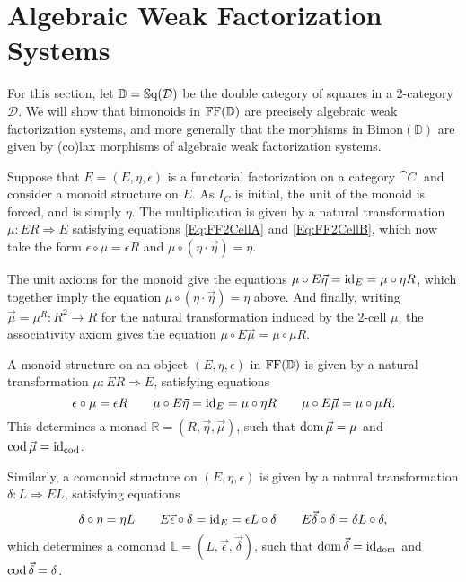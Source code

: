 
\chapter{Algebraic Weak Factorization Systems}

For this section, let $\mathbb{D}=\mathbb{S}\mathrm{q}(\mathcal{D})$ be the double category of squares in a 2-category $\mathcal{D}$. We will show that bimonoids in $\mathbb{F}\mathrm{F}(\mathbb{D})$ are precisely algebraic weak factorization systems, and more generally that the morphisms in $\mathrm{Bimon}(\mathbb{D})$ are given by (co)lax morphisms of algebraic weak factorization systems.

Suppose that $E=(E,\eta,\epsilon)$ is a functorial factorization on a category $\cat{C}$, and consider a monoid structure on $E$. As $I_C$ is initial, the unit of the monoid is forced, and is simply $\eta$. The multiplication is given by a natural transformation $\mu\colon ER\Rightarrow E$ satisfying equations \eqref{Eq:FF2CellA} and \eqref{Eq:FF2CellB}, which now take the form $\epsilon\circ\mu = \epsilon R$ and $\mu\circ(\eta\cdot\vec{\eta})=\eta$.

The unit axioms for the monoid give the equations $\mu\circ E\vec{\eta}=\operatorname{id}_E=\mu\circ\eta R$, which together imply the equation $\mu\circ(\eta\cdot\vec{\eta})=\eta$ above. And finally, writing $\vec{\mu}=\mu^R\colon R^2\to R$ for the natural transformation induced by the 2-cell $\mu$, the associativity axiom gives the equation $\mu\circ E\vec{\mu}=\mu\circ\mu R$.

\begin{proposition}
	A monoid structure on an object $(E,\eta,\epsilon)$ in $\mathbb{F}\mathrm{F}(\mathbb{\mathbb{D}})$ is given by a natural transformation $\mu\colon ER\Rightarrow E$, satisfying equations
	\begin{equation}
		\epsilon\circ\mu=\epsilon R \qquad 
			\mu\circ E\vec{\eta}=\operatorname{id}_E=\mu\circ\eta R \qquad 
			\mu\circ E\vec{\mu}=\mu\circ\mu R.
	\end{equation}
	This determines a monad $\mathbb{R}=(R,\vec{\eta},\vec{\mu})$, such that $\operatorname{dom}\vec{\mu}=\mu$ and $\operatorname{cod}\vec{\mu}=\operatorname{id}_{\operatorname{cod}}$.

	Similarly, a comonoid structure on $(E,\eta,\epsilon)$ is given by a natural transformation $\delta\colon L\Rightarrow EL$, satisfying equations
	\begin{equation}
		\delta\circ\eta=\eta L \qquad 
			E\vec{\epsilon}\circ\delta=\operatorname{id}_E=\epsilon L\circ\delta \qquad
			E\vec{\delta}\circ\delta=\delta L\circ\delta,
	\end{equation}
	which determines a comonad $\mathbb{L}=(L,\vec{\epsilon},\vec{\delta})$, such that $\operatorname{dom}\vec{\delta}=\operatorname{id}_{\operatorname{dom}}$ and $\operatorname{cod}\vec{\delta}=\delta$.
\end{proposition}

